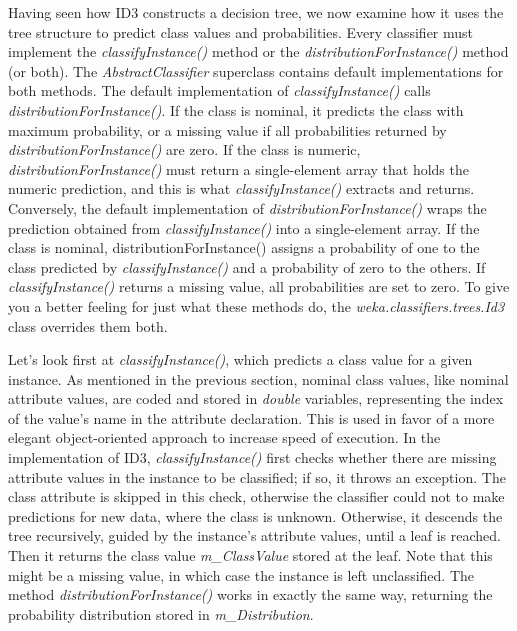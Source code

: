 Having seen how ID3 constructs a decision tree, we now examine how it
uses the tree structure to predict class values and
probabilities. Every classifier must implement the \textit{classifyInstance()}
method or the \textit{distributionForInstance()} method (or both). The
\textit{AbstractClassifier} superclass contains default implementations for both
methods. The default implementation of \textit{classifyInstance()} calls
\textit{distributionForInstance()}. If the class is nominal, it predicts the
class with maximum probability, or a missing value if all
probabilities returned by \textit{distributionForInstance()} are
zero. If the class is numeric, \textit{distributionForInstance()} must
return a single-element array that holds the numeric prediction, and
this is what \textit{classifyInstance()} extracts and
returns. Conversely, the default implementation
of \textit{distributionForInstance()} wraps the prediction obtained
from \textit{classifyInstance()} into a single-element array. If the
class is nominal, distributionForInstance() assigns a probability of
one to the class predicted by \textit{classifyInstance()} and a
probability of zero to the others. If \textit{classifyInstance()}
returns a missing value, all probabilities are set to zero. To give
you a better feeling for just what these methods do,
the \textit{weka.classifiers.trees.Id3} class overrides them both.


Let's look first at \textit{classifyInstance()}, which predicts a
class value for a given instance. As mentioned in the previous
section, nominal class values, like nominal attribute values, are
coded and stored in \textit{double} variables, representing the index
of the value's name in the attribute declaration. This is used in
favor of a more elegant object-oriented approach to increase speed of
execution. In the implementation of ID3, \textit{classifyInstance()}
first checks whether there are missing attribute values in the
instance to be classified; if so, it throws an exception. The class
attribute is skipped in this check, otherwise the classifier could not
to make predictions for new data, where the class is
unknown. Otherwise, it descends the tree recursively, guided by the
instance’s attribute values, until a leaf is reached. Then it returns
the class value \textit{m\_ClassValue} stored at the leaf. Note that
this might be a missing value, in which case the instance is left
unclassified. The method \textit{distributionForInstance()} works in
exactly the same way, returning the probability distribution stored in
\textit{m\_Distribution}.

